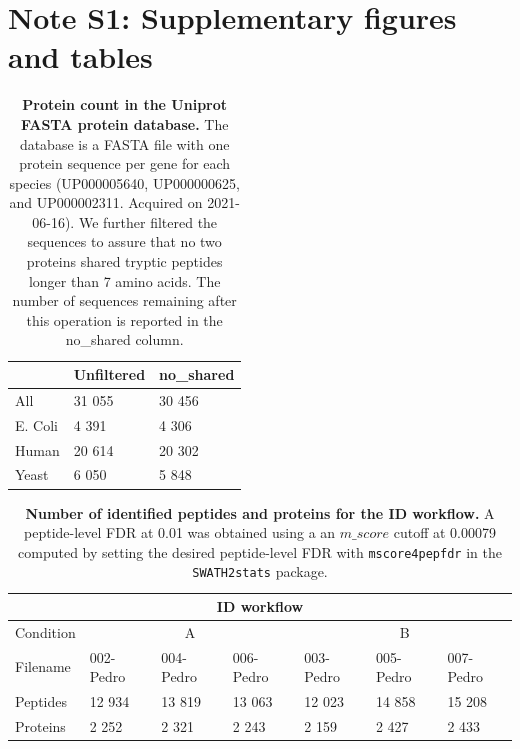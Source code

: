 \documentclass[11pt]{article}
\begin{document}
\maketitle

\section*{Note S1: Supplementary figures and tables}
\label{sec:fc-eval}


\begin{table}[hbt]
\centering
\begin{tabular}{lll}
\hline
        & Unfiltered & no\_shared \\ \hline
All     & 31 055     & 30 456     \\
E. Coli & 4 391      & 4 306      \\
Human   & 20 614     & 20 302     \\
Yeast   & 6 050      & 5 848      \\ \hline
\end{tabular}

  \caption{{\bf Protein count in the Uniprot FASTA protein database.} The database is a FASTA file with one protein sequence per gene for each species (UP000005640, UP000000625, and UP000002311. Acquired on 2021-06-16). We further filtered the sequences to assure that no two proteins shared tryptic peptides longer than 7 amino acids. The number of sequences remaining after this operation is reported in the no\_shared column. \label{table:proteins_in_database}}

\end{table}



\begin{table}[h]
    \begin{tabular}{l|lll|lll}
    \hline
    \multicolumn{7}{c}{ID workflow} \\ \hline
    Condition & \multicolumn{3}{c|}{A} & \multicolumn{3}{c}{B}\\
    \hline
    Filename       & 002-Pedro & 004-Pedro & 006-Pedro & 003-Pedro & 005-Pedro & 007-Pedro \\
    \hline
    Peptides  & 12 934                        & 13 819                        & 13 063                        & 12 023                        & 14 858                        & 15 208                        \\
    Proteins  & 2 252                         & 2 321                         & 2 243                         & 2 159                         & 2 427                         & 2 433                         \\ \hline
    \end{tabular}
     \caption{{\bf Number of identified peptides and proteins for the ID workflow.} A peptide-level FDR at 0.01 was obtained using a an $m\_score$ cutoff at 0.00079 computed by setting the desired peptide-level FDR with \texttt{mscore4pepfdr} in the \texttt{SWATH2stats} package.
          \label{fig:osw_peptide_and_protein_id}}
\end{table}
        
\end{document}
